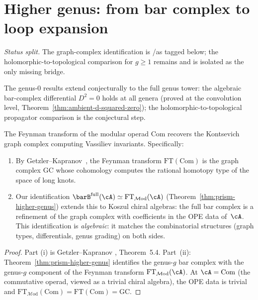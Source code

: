 \section{Higher genus: from bar complex to loop expansion}
\label{sec:bar-to-loop}
\noindent\emph{Status split.} The graph-complex identification is
\ClaimStatusProvedElsewhere/\ClaimStatusProvedHere as tagged below; the
holomorphic-to-topological comparison for $g \geq 1$ remains
\ClaimStatusConjectured and is isolated as the only missing bridge.

The genus-$0$ results extend conjecturally to the full genus tower:
the algebraic bar-complex differential $D^2 = 0$ holds at all genera
(proved at the convolution level, Theorem~\ref{thm:ambient-d-squared-zero});
the holomorphic-to-topological propagator comparison is the conjectural step.

\begin{proposition}
\label{prop:feynman-graph-complex}
The Feynman transform of the modular operad $\mathrm{Com}$
recovers the Kontsevich graph complex computing Vassiliev
invariants. Specifically:
\begin{enumerate}[label=\textup{(\roman*)}]
\item By Getzler--Kapranov~\cite{GeK98},
 the Feynman transform
 $\mathrm{FT}(\mathrm{Com})$ is the graph complex $\mathrm{GC}$
 whose cohomology computes the rational homotopy type of the
 space of long knots.
\item Our identification
 $\barB^{\mathrm{full}}(\cA)
 \simeq \mathrm{FT}_{\mathcal{M}\mathrm{od}}(\cA)$
 (Theorem~\ref{thm:prism-higher-genus}) extends this to Koszul
 chiral algebras: the full bar complex is a refinement of the
 graph complex with coefficients in the OPE data of~$\cA$.
 This identification is \emph{algebraic}: it matches the combinatorial
 structures (graph types, differentials, genus grading) on both sides.
\end{enumerate}
\end{proposition}

\begin{proof}
Part (i) is Getzler--Kapranov \cite{GeK98}, Theorem~5.4.
Part~(ii): Theorem~\ref{thm:prism-higher-genus} identifies the
genus-$g$ bar complex with the genus-$g$ component of the
Feynman transform $\mathrm{FT}_{\mathcal{M}\mathrm{od}}(\cA)$.
At $\cA = \mathrm{Com}$ (the commutative operad, viewed as a
trivial chiral algebra), the OPE data is trivial and
$\mathrm{FT}_{\mathcal{M}\mathrm{od}}(\mathrm{Com}) =
\mathrm{FT}(\mathrm{Com}) = \mathrm{GC}$.
\end{proof}

